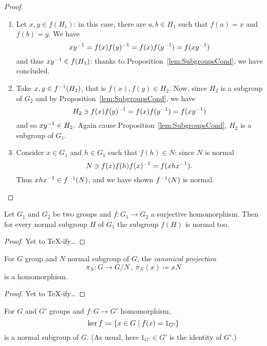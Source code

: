 \begin{proof}
\begin{enumerate}
\item Let \(x, y \in f(H_1)\): in this case, there are \(a, b \in H_1\) such that \(f(a) = x\) and \(f(b) = y\). We have
\[x y^{-1} = f(x) f(y)^{-1} = f(x) f(y^{-1}) = f(x y^{-1})\]
and thus \(x y^{-1} \in f(H_1)\): thanks to Proposition~\ref{lem:SubgroupsCond}, we have concluded.

\item Take \(x, y \in f^{-1}(H_2)\), that is \(f(x), f(y) \in H_2\). Now, since \(H_2\) is a subgroup of \(G_2\) and by Proposition~\ref{lem:SubgroupsCond}, we have
\[H_2 \owns f(x) f(y)^{-1} = f(x)f(y^{-1}) = f(x y^{-1})\]
and so \(x y^{-1} \in H_2\). Again cause Proposition~\ref{lem:SubgroupsCond}, \(H_2\) is a subgroup of \(G_1\).

\item Consider \(x \in G_1\) and \(h \in G_1\) such that \(f(h) \in N\): since \(N\) is normal
\[N \owns f(x) f(h) f(x)^{-1} = f(x h x^{-1}).\]
Thus \(x h x^{-1} \in f^{-1}(N)\), and we have shown \(f^{-1}(N)\) is normal.\qedhere
\end{enumerate}
\end{proof}

\begin{proposition}\label{prop:SurjectivityNormality}
Let \(G_1\) and \(G_2\) be two groups and \(f : G_1 \to G_2\) a surjective homomorphism. Then for every normal subgroup \(H\) of \(G_1\) the subgroup \(f(H)\) is normal too.
\end{proposition}

\begin{proof}
Yet to \TeX{}-ify\dots{}
\end{proof}

\begin{proposition}
For \(G\) group and \(N\) normal subgroup of \(G\), the {\em canonical projection}
\[\pi_N : G \to G/N\,, \ \pi_N(x) \coloneq xN\]
is a homomorphism.
\end{proposition}

\begin{proof}
Yet to \TeX{}-ify\dots{}
\end{proof}

\begin{proposition}
For \(G\) and \(G'\) groups and \(f : G \to G'\) homomorphism,
\[\ker f \coloneq \left\{x \in G \mid f(x) = 1_{G'}\right\}\]
is a normal subgroup of \(G\). (As usual, here \(1_{G'} \in G'\) is the identity of \(G'\).)
\end{proposition}

